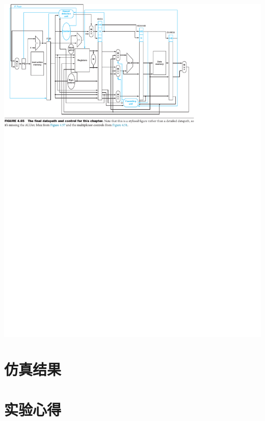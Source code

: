 \documentclass[a4paper,UTF8]{ctexart}
\begin{document}
\includegraphics[width=\textwidth]{FINAL.pdf}

\section{仿真结果}


\section{实验心得}
\end{document}
